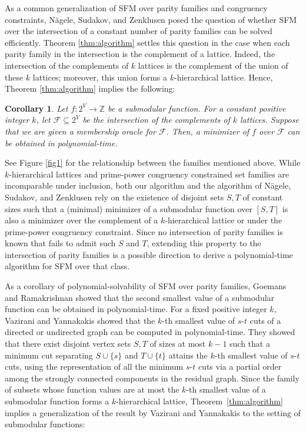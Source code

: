 \documentclass[11pt,letterpaper]{article}
\theoremstyle{plain}
\newtheorem{corollary}[theorem]{Corollary}
\theoremstyle{definition}
\begin{document}
As a common generalization of SFM over parity families and congruency constraints, N\"{a}gele, Sudakov, and Zenklusen \cite{nagele2019} posed the question of whether SFM over the intersection of a constant number of parity families can be solved efficiently.
Theorem \ref{thm:algorithm} settles this question in the case when each parity family in the intersection is the complement of a lattice.
Indeed, the intersection of the complements of $k$ lattices is the complement of the union of these $k$ lattices; moreover, this union forms a $k$-hierarchical lattice.
Hence, Theorem \ref{thm:algorithm} implies the following:

\begin{corollary}
\label{cor:parity_intersection}
Let $f:2^V\to \mathbb{Z}$ be a submodular function.
For a constant positive integer $k$, let $\mathcal{F}\subseteq 2^V$ be the intersection of the complements of $k$ lattices.
Suppose that we are given a membership oracle for $\mathcal{F}$.
Then, a minimizer of $f$ over $\mathcal{F}$ can be obtained in polynomial-time. 
\end{corollary}

See Figure \ref{fig1} for the relationship between the families mentioned above.
While $k$-hierarchical lattices and prime-power congruency constrained set families are incomparable under inclusion, both our algorithm and the algorithm of N\"{a}gele, Sudakov, and Zenklusen rely on the existence of disjoint sets $S,T$ of constant sizes such that a (minimal) minimizer of a submodular function over $[S,T]$ is also a minimizer over the complement of a $k$-hierarchical lattice or under the prime-power congruency constraint.
Since no intersection of parity families is known that fails to admit such $S$ and $T$, extending this property to the intersection of parity families is a possible direction to derive a polynomial-time algorithm for SFM over that class.

As a corollary of polynomial-solvability of SFM over parity families, Goemans and Ramakrishnan \cite{goemans1995} showed that the second smallest value of a submodular function can be obtained in polynomial-time.
For a fixed positive integer $k$, Vazirani and Yannakakis \cite{vazirani1992} showed that the $k$-th smallest value of $s$-$t$ cuts of a directed or undirected graph can be computed in polynomial-time.
They showed that there exist disjoint vertex sets $S,T$ of sizes at most $k-1$ such that a minimum cut separating $S\cup \{s\}$ and $T\cup \{t\}$ attains the $k$-th smallest value of $s$-$t$ cuts, using the representation of all the minimum $s$-$t$ cuts via a partial order among the strongly connected components in the residual graph.
Since the family of subsets whose function values are at most the $k$-th smallest value of a submodular function forms a $k$-hierarchical lattice, Theorem~\ref{thm:algorithm} implies a generalization of the result by Vazirani and Yannakakis to the setting of submodular functions:
\end{document}
